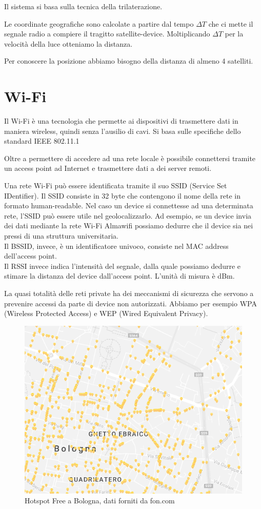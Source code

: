 \documentclass[12pt,a4paper,openright,twoside]{report}
\begin{document}
Il sistema si basa sulla tecnica della trilaterazione. 


Le coordinate geografiche sono calcolate a partire dal tempo $ \Delta T $ che ci mette il segnale radio a compiere il tragitto satellite-device. Moltiplicando $ \Delta T $ per la velocità della luce otteniamo la distanza. 

Per conoscere la posizione abbiamo bisogno della distanza di almeno 4 satelliti.

\section{Wi-Fi}
Il Wi-Fi è una tecnologia che permette ai dispositivi di trasmettere dati in maniera wireless, quindi senza l'ausilio di cavi. Si basa sulle specifiche dello standard IEEE 802.11.1

Oltre a permettere di accedere ad una rete locale è possibile connettersi tramite un access point ad Internet e trasmettere dati a dei server remoti.

Una rete Wi-Fi può essere identificata tramite il suo SSID (Service Set IDentifier). Il SSID consiste in 32 byte che contengono il nome della rete in formato human-readable. Nel caso un device si connettesse ad una determinata rete, l'SSID può essere utile nel geolocalizzarlo. 
Ad esempio, se un device invia dei dati mediante la rete Wi-Fi Almawifi possiamo dedurre che il device sia nei pressi di una struttura universitaria.\\
Il BSSID, invece, è un identificatore univoco, consiste nel MAC address dell'access point. \\
Il RSSI invece indica l'intensità del segnale, dalla quale possiamo dedurre e stimare la distanza del device dall'access point. L'unità di misura è dBm.

La quasi totalità delle reti private ha dei meccanismi di sicurezza che servono a prevenire accessi da parte di device non autorizzati. 
Abbiamo per esempio WPA (Wireless Protected Access) e WEP (Wired Equivalent Privacy).

\begin{figure}[h!]
\centering 
\includegraphics[scale=0.6]{fig7} 
\caption{Hotspot Free a Bologna, dati forniti da fon.com \cite{K16}} 
\end{figure}
\end{document}

